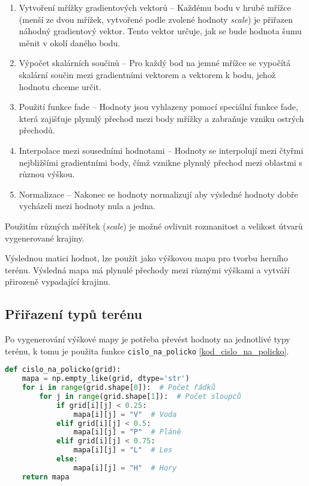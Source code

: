 \begin{enumerate}
    \item Vytvoření mřížky gradientových vektorů -- Každému bodu v hrubé mřížce (menší ze dvou mřížek, vytvořené podle zvolené hodnoty \textit{scale}) je přiřazen náhodný gradientový vektor. Tento vektor určuje, jak se bude hodnota šumu měnit v okolí daného bodu.
    \item Výpočet skalárních součinů -- Pro každý bod na jemné mřížce se vypočítá skalární součin mezi gradientními vektorem a vektorem k bodu, jehož hodnotu chceme určit.
    \item Použití funkce fade -- Hodnoty jsou vyhlazeny pomocí speciální funkce fade, která zajišťuje plynulý přechod mezi body mřížky a zabraňuje vzniku ostrých přechodů.
    \item Interpolace mezi sousedními hodnotami -- Hodnoty se interpolují mezi čtyřmi nejbližšími gradientními body, čímž vznikne plynulý přechod mezi oblastmi s různou výškou.
    \item Normalizace -- Nakonec se hodnoty normalizují aby výsledné hodnoty dobře vycházeli mezi hodnoty nula a jedna.
\end{enumerate}

Použitím různých měřítek (\textit{scale}) je možné ovlivnit rozmanitost a velikost útvarů vygenerované krajiny.

Výslednou matici hodnot, lze použít jako výškovou mapu pro tvorbu herního terénu. Výsledná mapa má plynulé přechody mezi různými výškami a vytváří přirozeně vypadající krajinu.

\subsection{Přiřazení typů terénu}

Po vygenerování výškové mapy je potřeba převést hodnoty na jednotlivé typy terénu, k tomu je použita funkce \texttt{cislo\_na\_policko} \ref{kod_cislo_na_policko}. 

\begin{lstlisting}[language=Python, caption=Převádějící výškovou mapu na konkrétní terény, label=kod_cislo_na_policko]
def cislo_na_policko(grid):
    mapa = np.empty_like(grid, dtype='str')
    for i in range(grid.shape[0]):  # Počet řádků
        for j in range(grid.shape[1]):  # Počet sloupců
            if grid[i][j] < 0.25:
                mapa[i][j] = "V"  # Voda
            elif grid[i][j] < 0.5:
                mapa[i][j] = "P"  # Pláně
            elif grid[i][j] < 0.75:
                mapa[i][j] = "L"  # Les
            else:
                mapa[i][j] = "H"  # Hory
    return mapa

\end{lstlisting}

